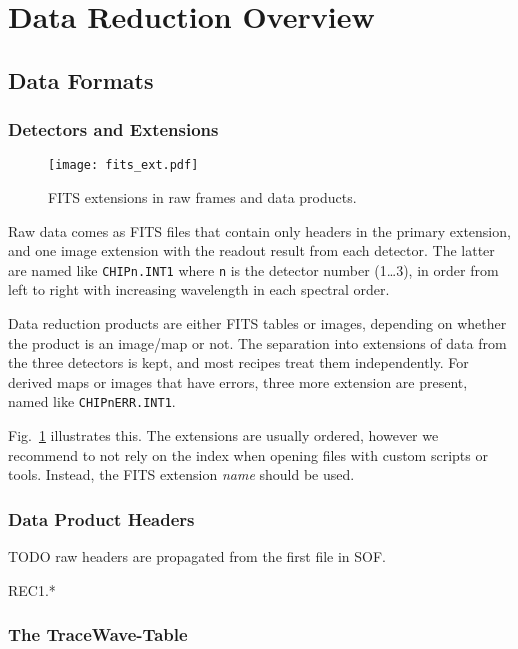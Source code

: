 \section{Data Reduction Overview}
\label{sec:overview}


\subsection{Data Formats}
\label{sec:data-fmt-quick}

\subsubsection{Detectors and Extensions}
\label{sec:extns}
\begin{figure}[!tb]
  \begin{center}
    \texttt{[image: fits\_ext.pdf]}
  \end{center}
  \caption{
    \label{fig:fits_ext}
    FITS extensions in raw frames and data products.
    }
\end{figure}

Raw data comes as FITS files that contain only headers in the primary extension,
and one image extension with the readout result from each detector. The latter
are named like \verb!CHIPn.INT1! where \texttt{n} is the detector number (1…3),
in order from left to right with increasing wavelength in each spectral order.

Data reduction products are either FITS tables or images, depending on whether
the product is an image/map or not. The separation into extensions of data from
the three detectors is kept, and most recipes treat them independently. For
derived maps or images that have errors, three more extension are present, named
like \texttt{CHIPnERR.INT1}.

Fig.~\ref{fig:fits_ext} illustrates this. The extensions are usually ordered,
however we recommend to not rely on the index when opening files with custom
scripts or tools. Instead, the FITS extension \emph{name} should be used.


\subsubsection{Data Product Headers}

TODO
raw headers are propagated from the first file in SOF.

REC1.*

\subsubsection{The TraceWave-Table}
\label{sec:tracewave}

